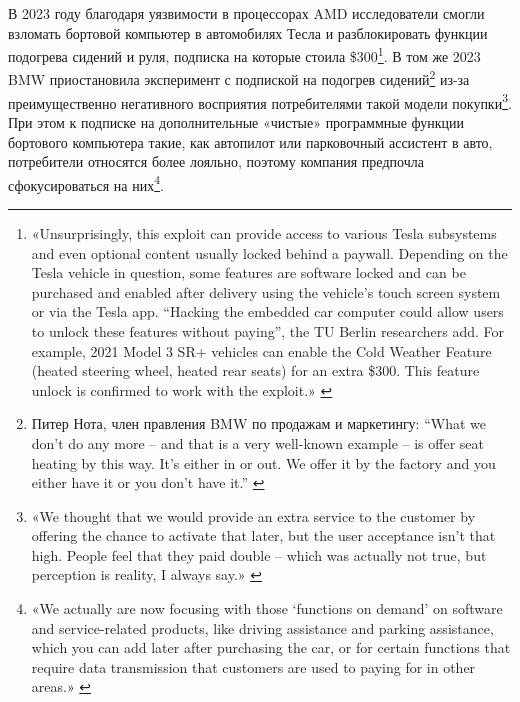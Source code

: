 \documentclass{article}
\begin{document}
В 2023 году благодаря уязвимости в процессорах AMD исследователи смогли взломать бортовой компьютер в автомобилях Тесла и разблокировать функции подогрева сидений и руля, подписка на которые стоила \$300\footnote{«Unsurprisingly, this exploit can provide access to various Tesla subsystems and even optional content usually locked behind a paywall. Depending on the Tesla vehicle in question, some features are software locked and can be purchased and enabled after delivery using the vehicle's touch screen system or via the Tesla app. “Hacking the embedded car computer could allow users to unlock these features without paying”, the TU Berlin researchers add. For example, 2021 Model 3 SR+ vehicles can enable the Cold Weather Feature (heated steering wheel, heated rear seats) for an extra \$300. This feature unlock is confirmed to work with the exploit.» \cite{tomshardwareTeslaUnlock2023}}. В том же 2023 BMW приостановила эксперимент с подпиской на подогрев сидений\footnote{Питер Нота, член правления BMW по продажам и маркетингу: “What we don’t do any more – and that is a very well-known example – is offer seat heating by this way. It’s either in or out. We offer it by the factory and you either have it or you don’t have it.” \cite{autocarBmwHardwareSubsription2023}} из-за преимущественно негативного восприятия потребителями такой модели покупки\footnote{«We thought that we would provide an extra service to the customer by offering the chance to activate that later, but the user acceptance isn’t that high. People feel that they paid double – which was actually not true, but perception is reality, I always say.» \cite{autocarBmwHardwareSubsription2023}}. При этом к подписке на дополнительные «чистые» программные функции бортового компьютера такие, как автопилот или парковочный ассистент в авто, потребители относятся более лояльно, поэтому компания предпочла сфокусироваться на них\footnote{«We actually are now focusing with those ‘functions on demand’ on software and service-related products, like driving assistance and parking assistance, which you can add later after purchasing the car, or for certain functions that require data transmission that customers are used to paying for in other areas.» \cite{autocarBmwHardwareSubsription2023}}.
\end{document}
